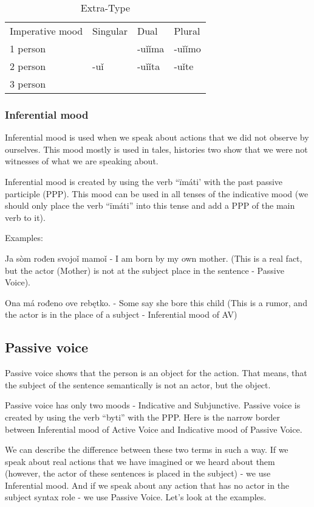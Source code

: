 \begin{table}
	\caption{Extra-Type}
	\begin{tabular}{llll}
		Imperative mood & Singular & Dual & Plural \\
		1 person &  & -uǐǐma & -uǐǐmo \\
		2 person & -uǐ & -uǐǐta & -uǐte \\
		3 person &  &  & 
	\end{tabular}
\end{table}

\subsubsection{Inferential mood}

Inferential mood is used when we speak about actions that we did not observe by ourselves. This mood mostly is used in tales, histories two show that we were not witnesses of what we are speaking about.

Inferential mood is created by using the verb “ïmáti’ with the past passive participle (PPP). This mood can be used in all tenses of the indicative mood (we should only place the verb “ïmáti” into this tense and add a PPP of the main verb to it). 

Examples:

Ja sòm rođen svojoǐ mamoǐ - I am born by my own mother. (This is a real fact, but the actor (Mother) is not at the subject place in the sentence - Passive Voice).

Ona má rođeno ove rebętko. - Some say she bore this child (This is a rumor, and the actor is in the place of a subject - Inferential mood of AV)

\subsection{Passive voice}

Passive voice shows that the person is an object for the action. That means, that the subject of the sentence semantically is not an actor, but the object. 

Passive voice has only two moods - Indicative and Subjunctive. Passive voice is created by using the verb “byti” with the PPP. Here is the narrow border between Inferential mood of Active Voice and Indicative mood of Passive Voice.

We can describe the difference between these two terms in such a way. If we speak about real actions that we have imagined or we heard about them (however, the actor of these sentences is placed in the subject) - we use Inferential mood. And if we speak about any action that has no actor in the subject syntax role - we use Passive Voice. Let’s look at the examples.





